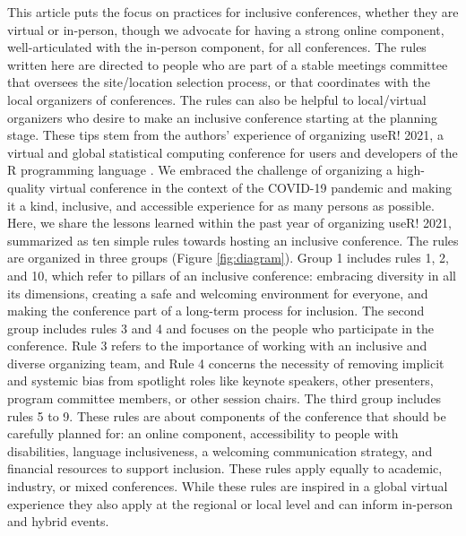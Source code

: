 \documentclass[10pt,letterpaper]{article}
\begin{document}
This article puts the focus on practices for inclusive conferences, whether they are virtual or in-person, though we advocate for having a strong online component, well-articulated with the in-person component, for all conferences.
The rules written here are directed to people who are part of a stable meetings committee that oversees the site/location selection process, or that coordinates with the local organizers of conferences.
The rules can also be helpful to local/virtual organizers who desire to make an inclusive conference starting at the planning stage.
These tips stem from the authors' experience of organizing useR! 2021, a virtual and global statistical computing conference for users and developers of the R programming language \cite{r_core_team_2021}. 
We embraced the challenge of organizing a high-quality virtual conference in the context of the COVID-19 pandemic and making it a kind, inclusive, and accessible experience for as many persons as possible. 
Here, we share the lessons learned within the past year of organizing useR! 2021, summarized as ten simple rules towards hosting an inclusive conference.
The rules are organized in three groups (Figure \ref{fig:diagram}). %
Group 1 includes rules 1, 2, and 10, which refer to pillars of an inclusive conference: embracing diversity in all its dimensions, creating a safe and welcoming environment for everyone, and making the conference part of a long-term process for inclusion.
The second group includes rules 3 and 4 and focuses on the people who participate in the conference. 
Rule 3 refers to the importance of working with an inclusive and diverse organizing team, and Rule 4 concerns the necessity of removing implicit and systemic bias from spotlight roles like keynote speakers, other presenters, program committee members, or other session chairs. 
The third group includes rules 5 to 9. These rules are about components of the conference that should be carefully planned for: an online component, accessibility to people with disabilities, language inclusiveness, a welcoming communication strategy, and financial resources to support inclusion. 
These rules apply equally to academic, industry, or mixed conferences. While these rules are inspired in a global virtual experience they also apply at the regional or local level and can inform in-person and hybrid events.
\end{document}
